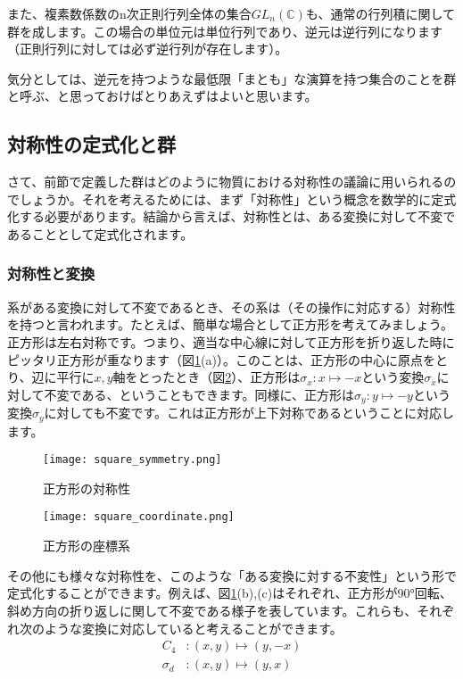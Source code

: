 \documentclass[uplatex,dvipdfmx]{jsarticle}
\begin{document}
また、複素数係数のn次正則行列全体の集合$GL_n(\mathbb{C})$も、通常の行列積に関して群を成します。この場合の単位元は単位行列であり、逆元は逆行列になります（正則行列に対しては必ず逆行列が存在します）。

気分としては、逆元を持つような最低限「まとも」な演算を持つ集合のことを群と呼ぶ、と思っておけばとりあえずはよいと思います。

\subsection{対称性の定式化と群}
さて、前節で定義した群はどのように物質における対称性の議論に用いられるのでしょうか。それを考えるためには、まず「対称性」という概念を数学的に定式化する必要があります。結論から言えば、対称性とは、ある変換に対して不変であることとして定式化されます。

\subsubsection{対称性と変換}
系がある変換に対して不変であるとき、その系は（その操作に対応する）対称性を持つと言われます。たとえば、簡単な場合として正方形を考えてみましょう。正方形は左右対称です。つまり、適当な中心線に対して正方形を折り返した時にピッタリ正方形が重なります（図\ref{fig:square_symmetry}(a)）。このことは、正方形の中心に原点をとり、辺に平行に$x,y$軸をとったとき（図\ref{fig:square_coordinate}）、正方形は$\sigma_x:x\mapsto -x$という変換$\sigma_x$に対して不変である、ということもできます。同様に、正方形は$\sigma_y:y\mapsto -y$という変換$\sigma_y$に対しても不変です。これは正方形が上下対称であるということに対応します。

\begin{figure}[htbp]
	\centering
	\texttt{[image: square\_symmetry.png]}
	\caption{正方形の対称性}
	\label{fig:square_symmetry}
\end{figure}

\begin{figure}[htbp]
	\centering
	\texttt{[image: square\_coordinate.png]}
	\caption{正方形の座標系}
	\label{fig:square_coordinate}
\end{figure}

その他にも様々な対称性を、このような「ある変換に対する不変性」という形で定式化することができます。例えば、図\ref{fig:square_symmetry}(b),(c)はそれぞれ、正方形が90°回転、斜め方向の折り返しに関して不変である様子を表しています。これらも、それぞれ次のような変換に対応していると考えることができます。
\begin{align}
	C_4&: (x,y)\mapsto (y,-x)\\
	\sigma_d&: (x,y) \mapsto (y,x)
\end{align}
\end{document}
